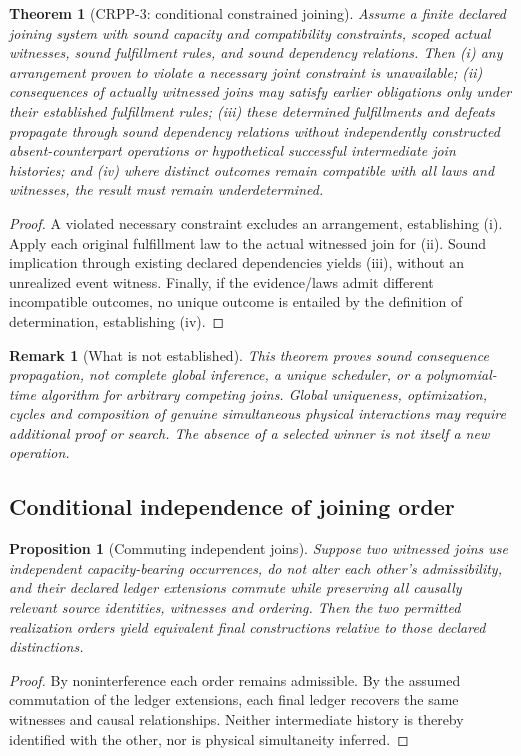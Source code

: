 \documentclass[11pt]{article}
\newtheorem{proposition}[definition]{Proposition}
\newtheorem{theorem}[definition]{Theorem}
\newtheorem{remark}[definition]{Remark}
\begin{document}
\begin{theorem}[CRPP-3: conditional constrained joining]
Assume a finite declared joining system with sound capacity
and compatibility constraints, scoped actual witnesses,
sound fulfillment rules, and sound dependency relations.
Then (i) any arrangement proven to violate a necessary
joint constraint is unavailable; (ii) consequences of
actually witnessed joins may satisfy earlier obligations
only under their established fulfillment rules; (iii) these
determined fulfillments and defeats propagate through
sound dependency relations without independently constructed
absent-counterpart operations or hypothetical successful
intermediate join histories; and (iv) where distinct outcomes
remain compatible with all laws and witnesses, the result must
remain underdetermined.
\end{theorem}
\begin{proof}
A violated necessary constraint excludes an arrangement,
establishing (i). Apply each original fulfillment law to the
actual witnessed join for (ii). Sound implication through
existing declared dependencies yields (iii), without an
unrealized event witness. Finally, if the evidence/laws admit
different incompatible outcomes, no unique outcome is entailed
by the definition of determination, establishing (iv).
\end{proof}

\begin{remark}[What is not established]
This theorem proves sound consequence propagation, not complete
global inference, a unique scheduler, or a polynomial-time
algorithm for arbitrary competing joins. Global uniqueness,
optimization, cycles and composition of genuine simultaneous
physical interactions may require additional proof or search.
The absence of a selected winner is not itself a new operation.
\end{remark}

\subsection{Conditional independence of joining order}
\begin{proposition}[Commuting independent joins]
Suppose two witnessed joins use independent capacity-bearing
occurrences, do not alter each other's admissibility, and
their declared ledger extensions commute while preserving all
causally relevant source identities, witnesses and ordering.
Then the two permitted realization orders yield equivalent
final constructions relative to those declared distinctions.
\end{proposition}
\begin{proof}
By noninterference each order remains admissible. By the
assumed commutation of the ledger extensions, each final ledger
recovers the same witnesses and causal relationships.
Neither intermediate history is thereby identified with
the other, nor is physical simultaneity inferred.
\end{proof}
\end{document}
